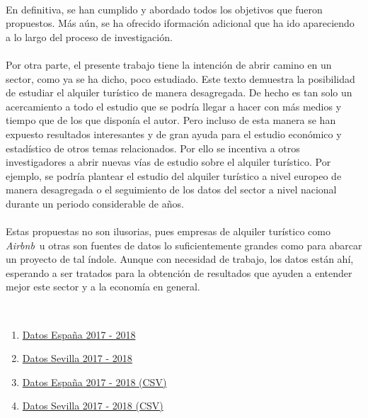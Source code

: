 \documentclass[a4paper,10pt]{article}
\newcommand*{\airbnb}{\textit{Airbnb}}
\begin{document}
\begin{multicols}{2}
        \paragraph*{}
        En definitiva, se han cumplido y abordado todos los objetivos que fueron propuestos. Más aún, se ha ofrecido iformación adicional que ha 
        ido apareciendo a lo largo del proceso de investigación. 
        
        \paragraph*{}
        Por otra parte, el presente trabajo tiene la intención de abrir camino en un sector,
        como ya se ha dicho, poco estudiado. Este texto demuestra la posibilidad de estudiar el alquiler turístico de manera desagregada. De hecho es
        tan solo un acercamiento a todo el estudio que se podría llegar a hacer con más medios y tiempo que de los que disponía el autor. Pero incluso 
        de esta manera se han expuesto resultados interesantes y de gran ayuda para el estudio económico y estadístico de otros temas relacionados.
        Por ello se incentiva a otros investigadores a abrir nuevas vías de estudio sobre el alquiler turístico. Por ejemplo, se podría 
        plantear el estudio del alquiler turístico a nivel europeo de manera desagregada o el seguimiento de los datos del sector a nivel nacional durante 
        un periodo considerable de años. 

        \paragraph*{}
        Estas propuestas no son ilusorias, pues empresas de alquiler turístico como \airbnb \ u otras son fuentes de datos lo suficientemente grandes
        como para abarcar un proyecto de tal índole. Aunque con necesidad de trabajo, los datos están ahí, esperando a ser tratados para la obtención de 
        resultados que ayuden a entender mejor este sector y a la economía en general.

    \begin{thebibliography}{20}

                \ 
                \begin{enumerate}
                    \item \href{https://datahippo.org/es/region/599216cb8a4655339b819813/}{Datos España 2017 - 2018}
                    \item \href{https://datahippo.org/es/region/599230af8a46554edf884651/}{Datos Sevilla 2017 - 2018}
                    \item \href{https://datahippo.org/media/regions/58612732-b2dc-433b-ab78-b8fbe5bbbb16/599216cb8a4655339b819813_airbnb.csv}{Datos España 2017 - 2018 (CSV)}
                    \item \href{https://datahippo.org/media/regions/7e3f7365-8ec0-42f1-a277-9b82743b8a39/599230af8a46554edf884651_airbnb.csv}{Datos Sevilla 2017 - 2018 (CSV)}
                \end{enumerate}
            

\end{thebibliography}
\end{multicols}
\end{document}
